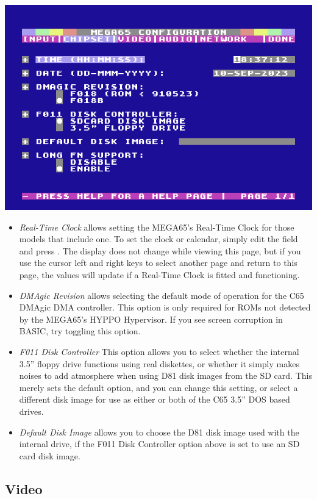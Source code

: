 \includegraphics[width=\linewidth]{images/ss-m65config-2.png}

\begin{itemize}
  \item{\em Real-Time Clock} allows setting the MEGA65's Real-Time
    Clock for those models that include one.  To set the clock or
    calendar, simply edit the field and press .
    The display does not change while viewing this page, but if
    you use the cursor left and right keys to select another page and
    return to this page, the values will update if a Real-Time Clock
    is fitted and functioning.
  \item{\em DMAgic Revision} allows selecting the default mode of
    operation for the C65 DMAgic DMA controller.  This option is only
    required for ROMs not detected by the MEGA65's HYPPO Hypervisor.
    If you see screen corruption in BASIC,
    try toggling this option.
  \item{\em F011 Disk Controller}
    This option allows you to select whether the internal 3.5'' floppy
    drive functions using real diskettes, or whether it simply makes
    noises to add atmosphere when using D81 disk images from the SD
    card.  This merely sets the default option, and you can change
    this setting, or select a different disk image for use as either
    or both of the C65 3.5'' DOS based drives.
  \item{\em Default Disk Image} allows you to choose the D81 disk image
    used with the internal drive, if the F011 Disk
    Controller option above is set to use an SD card disk image.
\end{itemize}

\subsection{Video}

